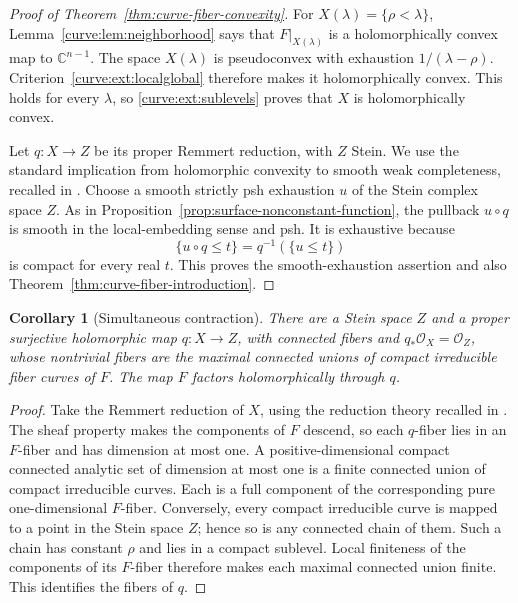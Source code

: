 \documentclass[11pt]{amsart}
\newtheorem{corollary}[theorem]{Corollary}
\theoremstyle{definition}
\theoremstyle{remark}
\numberwithin{equation}{section}
\newcommand{\C}{\mathbb C}
\newcommand{\OO}{\mathcal O}
\begin{document}
\begin{proof}[Proof of Theorem~\ref{thm:curve-fiber-convexity}]
For \(X(\lambda)=\{\rho<\lambda\}\),
Lemma~\ref{curve:lem:neighborhood} says that \(F|_{X(\lambda)}\) is a
holomorphically convex map to \(\C^{n-1}\).
The space \(X(\lambda)\) is pseudoconvex with exhaustion
\(1/(\lambda-\rho)\).
Criterion~\ref{curve:ext:localglobal} therefore makes it holomorphically
convex. This holds for every \(\lambda\), so
\ref{curve:ext:sublevels} proves that \(X\) is holomorphically convex.

Let \(q:X\to Z\) be its proper Remmert reduction, with \(Z\) Stein.
We use the standard implication from holomorphic convexity to smooth
weak completeness, recalled in \cite[p.~1659]{Vajaitu2022}.
Choose a smooth strictly psh exhaustion \(u\) of the Stein complex
space \(Z\).  As in Proposition~\ref{prop:surface-nonconstant-function},
the pullback \(u\circ q\) is smooth in the local-embedding sense
and psh.  It is exhaustive because
\[
 \{u\circ q\le t\}=q^{-1}(\{u\le t\})
\]
is compact for every real \(t\).  This proves the smooth-exhaustion
assertion and also Theorem~\ref{thm:curve-fiber-introduction}.
\end{proof}

\begin{corollary}[Simultaneous contraction]\label{cor:curve-contraction}
There are a Stein space \(Z\) and a proper surjective holomorphic
map \(q:X\to Z\), with connected fibers and \(q_*\OO_X=\OO_Z\),
whose nontrivial fibers are the maximal connected unions of
compact irreducible fiber curves of \(F\).
The map \(F\) factors holomorphically through \(q\).
\end{corollary}
\begin{proof}
Take the Remmert reduction of \(X\), using the reduction theory
recalled in \cite[proof of Proposition~2.4, p.~457]{VijituForum2022}.
The sheaf property makes the components of \(F\) descend, so each
\(q\)-fiber lies in an \(F\)-fiber and has dimension at most one.
A positive-dimensional compact connected analytic set of dimension
at most one is a finite connected union of compact irreducible curves.
Each is a full component of the corresponding pure one-dimensional
\(F\)-fiber.
Conversely, every compact irreducible curve is mapped to a point
in the Stein space \(Z\); hence so is any connected chain of them.
Such a chain has constant \(\rho\) and lies in a compact sublevel.
Local finiteness of the components of its \(F\)-fiber therefore
makes each maximal connected union finite.
This identifies the fibers of \(q\).
\end{proof}
\end{document}
